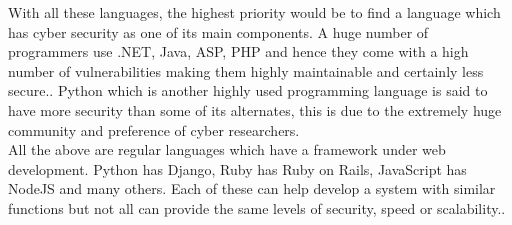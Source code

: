 \documentclass[../main.tex]{subfiles}
\begin{document}
With all these languages, the highest priority would be to find a language which has cyber security as one of its main components. A huge number of programmers use .NET, Java, ASP, PHP and hence they come with a high number of vulnerabilities making them highly maintainable and certainly less secure.\cite{securelanguage}. Python which is another highly used programming language is said to have more security than some of its alternates, this is due to the extremely huge community and preference of cyber researchers.\cite{topfivecyber}  \\[4mm]

All the above are regular languages which have a framework under web development. Python has Django, Ruby has Ruby on Rails, JavaScript has NodeJS and many others. Each of these can help develop a system with similar functions but not all can provide the same levels of security, speed or scalability.\cite{djangovslaravel}\cite{webdev}. 
\end{document}
